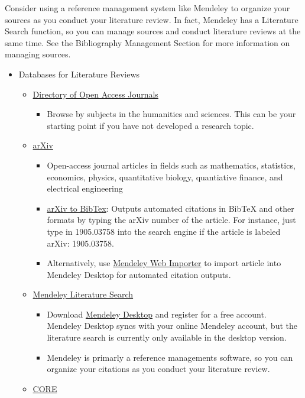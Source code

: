 \documentclass[]{book}
\providecommand{\tightlist}{%
  \setlength{\itemsep}{0pt}\setlength{\parskip}{0pt}}
\begin{document}
Consider using a reference management system like Mendeley to organize your sources as you conduct your literature review. In fact, Mendeley has a Literature Search function, so you can manage sources and conduct literature reviews at the same time. See the Bibliography Management Section for more information on managing sources.

\begin{itemize}
\item
  Databases for Literature Reviews

  \begin{itemize}
  \tightlist
  \item
    \href{https://doaj.org/subjects}{Directory of Open Access Journals}

    \begin{itemize}
    \tightlist
    \item
      Browse by subjects in the humanities and sciences. This can be your starting point if you have not developed a research topic.
    \end{itemize}
  \item
    \href{https://arxiv.org/}{arXiv}

    \begin{itemize}
    \tightlist
    \item
      Open-access journal articles in fields such as mathematics, statistics, economics, physics, quantitative biology, quantiative finance, and electrical engineering
    \item
      \href{https://arxiv2bibtex.org}{arXiv to BibTex}: Outputs automated citations in BibTeX and other formats by typing the arXiv number of the article. For instance, just type in 1905.03758 into the search engine if the article is labeled arXiv: 1905.03758.
    \item
      Alternatively, use \href{https://www.mendeley.com/reference-management/web-importer\#id_2}{Mendeley Web Importer} to import article into Mendeley Desktop for automated citation outputs.
    \end{itemize}
  \item
    \href{https://blog.mendeley.com/2013/07/08/new-release-literature-search-from-within-mendeley-deskop/}{Mendeley Literature Search}

    \begin{itemize}
    \tightlist
    \item
      Download \href{https://www.mendeley.com/download-desktop/}{Mendeley Desktop} and register for a free account. Mendeley Desktop syncs with your online Mendeley account, but the literature search is currently only available in the desktop version.
    \item
      Mendeley is primarly a reference managements software, so you can organize your citations as you conduct your literature review.
    \end{itemize}
  \item
    \href{https://core.ac.uk/}{CORE}


\end{itemize}
\end{itemize}
\end{document}
